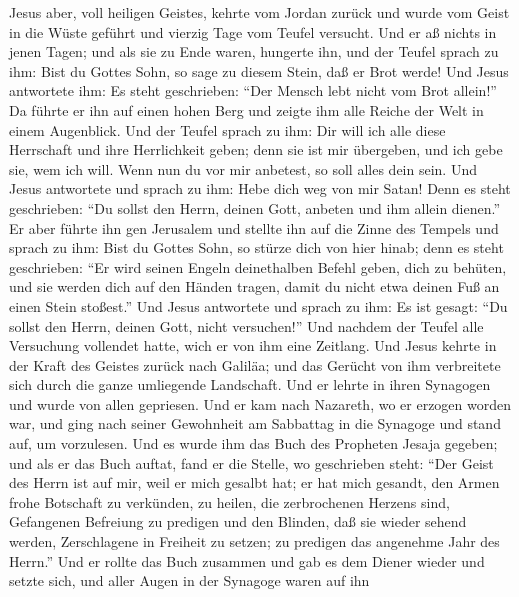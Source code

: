  Jesus aber, voll heiligen Geistes, kehrte vom Jordan
zurück und wurde vom Geist in die Wüste geführt und vierzig Tage vom
Teufel versucht.  Und er aß nichts in jenen Tagen; und als
sie zu Ende waren, hungerte ihn,  und der Teufel sprach zu
ihm: Bist du Gottes Sohn, so sage zu diesem Stein, daß er Brot werde!
 Und Jesus antwortete ihm: Es steht geschrieben: ``Der
Mensch lebt nicht vom Brot allein!''  Da führte er ihn auf
einen hohen Berg und zeigte ihm alle Reiche der Welt in einem
Augenblick.  Und der Teufel sprach zu ihm: Dir will ich
alle diese Herrschaft und ihre Herrlichkeit geben; denn sie ist mir
übergeben, und ich gebe sie, wem ich will.  Wenn nun du
vor mir anbetest, so soll alles dein sein.  Und Jesus
antwortete und sprach zu ihm: Hebe dich weg von mir Satan! Denn es steht
geschrieben: ``Du sollst den Herrn, deinen Gott, anbeten und ihm allein
dienen.''  Er aber führte ihn gen Jerusalem und stellte
ihn auf die Zinne des Tempels und sprach zu ihm: Bist du Gottes Sohn, so
stürze dich von hier hinab;  denn es steht geschrieben:
``Er wird seinen Engeln deinethalben Befehl geben, dich zu behüten,
 und sie werden dich auf den Händen tragen, damit du
nicht etwa deinen Fuß an einen Stein stoßest.''  Und
Jesus antwortete und sprach zu ihm: Es ist gesagt: ``Du sollst den
Herrn, deinen Gott, nicht versuchen!''  Und nachdem der
Teufel alle Versuchung vollendet hatte, wich er von ihm eine Zeitlang.
 Und Jesus kehrte in der Kraft des Geistes zurück nach
Galiläa; und das Gerücht von ihm verbreitete sich durch die ganze
umliegende Landschaft.  Und er lehrte in ihren Synagogen
und wurde von allen gepriesen.  Und er kam nach Nazareth,
wo er erzogen worden war, und ging nach seiner Gewohnheit am Sabbattag
in die Synagoge und stand auf, um vorzulesen.  Und es
wurde ihm das Buch des Propheten Jesaja gegeben; und als er das Buch
auftat, fand er die Stelle, wo geschrieben steht:  ``Der
Geist des Herrn ist auf mir, weil er mich gesalbt hat; er hat mich
gesandt, den Armen frohe Botschaft zu verkünden, zu heilen, die
zerbrochenen Herzens sind, Gefangenen Befreiung zu predigen und den
Blinden, daß sie wieder sehend werden, Zerschlagene in Freiheit zu
setzen;  zu predigen das angenehme Jahr des Herrn.''
 Und er rollte das Buch zusammen und gab es dem Diener
wieder und setzte sich, und aller Augen in der Synagoge waren auf ihn
